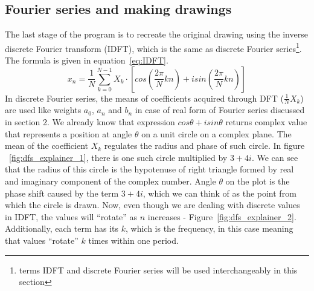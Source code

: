 \documentclass[titlepage]{article}
\begin{document}
\subsection{Fourier series and making drawings}

    The last stage of the program is to recreate the original drawing using the
    inverse discrete Fourier transform (IDFT), which is the same as discrete
    Fourier series\footnote{terms IDFT and discrete Fourier series will be used
    interchangeably in this section}. The formula is given in equation~\eqref{eq:IDFT}.
    \begin{equation}\label{eq:IDFT}
        x_n = \frac{1}{N}\sum_{k=0}^{N-1}X_k \cdot \left[cos\left(\frac{2\pi}{N}kn\right) +
        isin\left(\frac{2\pi}{N}kn\right)\right]
    \end{equation}
    In discrete Fourier series, the means of coefficients acquired through DFT 
    ($\frac{1}{N}X_k$) are used like weights $a_0$, $a_n$ and $b_n$ in case of 
    real form of Fourier series discussed in section 2. We already know that 
    expression $cos\theta + isin\theta$ returns complex value that represents a
    position at angle $\theta$ on a unit circle on a complex plane. The mean of
    the coefficient $X_k$ regulates the radius and phase of such circle. In figure
    ~\ref{fig:dfs_explainer_1}, there is one such circle multiplied by $3+4i$. We can
    see that the radius of this circle is the hypotenuse of right triangle formed
    by real and imaginary component of the complex number. Angle $\theta$ on the
    plot is the phase shift caused by the term $3+4i$, which we can think of as
    the point from which the circle is drawn. Now, even though we are 
    dealing with discrete values in IDFT, the values will ``rotate''
    as $n$ increases - Figure~\ref{fig:dfs_explainer_2}. Additionally, each term 
    has its $k$, which is the frequency, in this case meaning that values ``rotate''
    $k$ times within one period.
\end{document}

